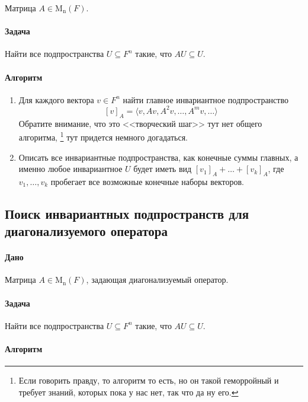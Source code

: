 \documentclass{article}
\newcommand{\Matrix}[2]{\operatorname{\mathrm{M}_{#2}}(#1)}
\begin{document}
Матрица $A\in\Matrix{F}{n}$.

\paragraph{Задача}

Найти все подпространства $U\subseteq F^n$ такие, что $A U \subseteq U$.

\paragraph{Алгоритм}

\begin{enumerate}
\item Для каждого вектора $v\in F^n$ найти главное инвариантное подпространство
\[
[v]_A = \langle v, Av, A^2v, \ldots, A^mv, \ldots\rangle
\]
Обратите внимание, что это <<творческий шаг>> тут нет общего алгоритма,%
\footnote{Если говорить правду, то алгоритм то есть, но он такой геморройный и требует знаний, которых пока у нас нет, так что да ну его.}
тут придется немного догадаться.

\item Описать все инвариантные подпространства, как конечные суммы главных, а именно любое инвариантное $U$ будет иметь вид $[v_1]_A + \ldots +[v_k]_A$, где $v_1,\ldots, v_k$ пробегает все возможные конечные наборы векторов.
\end{enumerate}

\subsection{Поиск инвариантных подпространств для диагонализуемого оператора}

\paragraph{Дано}

Матрица $A\in\Matrix{F}{n}$, задающая диагонализуемый оператор.

\paragraph{Задача}

Найти все подпространства $U\subseteq F^n$ такие, что $A U \subseteq U$.

\paragraph{Алгоритм}
\end{document}
